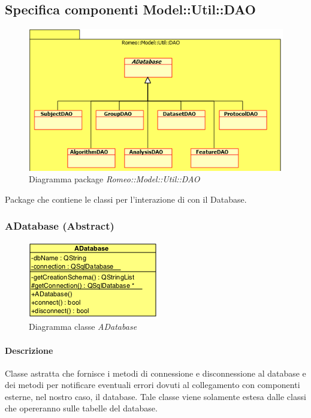 \subsection{Specifica componenti Model::Util::DAO}
\label{specificaDAO}
\begin{figure}[!h]
\centering
\includegraphics[scale=0.8]{../Specifica_Tecnica/Content/Immagini/Romeo__Model__Util__DAO.png}
			\caption{Diagramma package \textsl{Romeo::Model::Util::DAO}}
			\label{comp_romeo::model::util::dao}
\end{figure}
Package\g{} che contiene le classi per l'interazione di \project con il Database.

\color{black}

\pagebreak
\subsubsection{ADatabase (Abstract)}
\label{speadatabase}
\begin{figure}[!h]
\centering
			\includegraphics[scale=1]{./Content/Immagini/model/ADatabase.png}
			\caption{Diagramma classe \textsl{ADatabase}}
			\label{cl_adatabase}
\end{figure}

\paragraph{Descrizione \\}
Classe astratta che fornisce i metodi di connessione e disconnessione al database e dei metodi per notificare eventuali errori dovuti al collegamento con componenti esterne, nel nostro caso, il database. Tale classe viene solamente estesa dalle classi che opereranno sulle tabelle del database.

